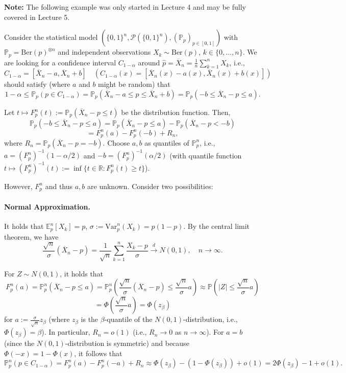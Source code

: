 \documentclass[open=any, 11pt,paper=A4]{scrreprt}
\begin{document}
\textbf{Note:} The following example was only started in Lecture 4 and may be fully covered in Lecture 5.

\begin{example}
Consider the statistical model \((\{0,1\}^n, \mathcal{P}(\{0,1\}^n), (\mathbb{P}_p)_{p \in [0,1]})\) with \(\mathbb{P}_p = \text{Ber}(p)^{\otimes n}\) and independent observations \(X_k \sim \text{Ber}(p)\), \( k \in \{0, \ldots, n\}\). We are looking for a confidence interval \( C_{1-\alpha} \) around \( \hat{p} = \overline{X}_n = \frac{1}{n} \sum_{k=1}^n X_k \), i.e.,
\[
C_{1-\alpha} = [\overline{X}_n - a, \overline{X}_n + b] \quad \left(C_{1-\alpha}(x) = [\overline{X}_n(x) - a(x), \overline{X}_n(x) + b(x)] \right)
\]
should satisfy (where \(a\) and \(b\) might be random) that
\[
1 - \alpha \leq \mathbb{P}_p \left( p \in C_{1-\alpha} \right) = \mathbb{P}_p \left( \overline{X}_n - a \leq p \leq \overline{X}_n + b \right) = \mathbb{P}_p \left(-b \leq \overline{X}_n - p \leq a \right).
\]

Let \(t \mapsto F_p^n(t) := \mathbb{P}_p \left( \overline{X}_n - p \leq t \right)\) be the distribution function. Then,
\[
\mathbb{P}_p \left(-b \leq \overline{X}_n - p \leq a \right) = \mathbb{P}_p \left( \overline{X}_n - p \leq a \right) - \mathbb{P}_p \left( \overline{X}_n - p < -b \right)
\]
\[
= F_p^n(a) - F_p^n(-b) + R_n,
\]
where \( R_n = \mathbb{P}_p \left( \overline{X}_n - p = -b \right) \). Choose \(a, b\) as quantiles of \(\mathbb{P}_p^n\), i.e., \(a = \left(F_p^n\right)^{-1}(1 - \alpha / 2)\) and \( -b = \left(F_p^n\right)^{-1}(\alpha / 2)\) (with quantile function \(t \mapsto \left(F_p^n\right)^{-1}(t) := \inf \{t \in \mathbb{R} : F_p^n(t) \geq t \}\)).

However, \(F_p^n\) and thus \(a, b\) are unknown. Consider two possibilities:

\paragraph{Normal Approximation.} It holds that \( \mathbb{E}_p^n[X_k] = p \), \( \sigma := \text{Var}_p^n(X_k) = p(1 - p) \). By the central limit theorem, we have
\[
\frac{\sqrt{n}}{\sigma} \left( \overline{X}_n - p \right) = \frac{1}{\sqrt{n}} \sum_{k=1}^n \frac{X_k - p}{\sigma} \xrightarrow{d} N(0,1), \quad n \to \infty.
\]

For \( Z \sim N(0,1) \), it holds that
\[
F_p^n(a) = \mathbb{P}_p^n \left( \overline{X}_n - p \leq a \right) = \mathbb{P}_p^n \left( \frac{\sqrt{n}}{\sigma} \left( \overline{X}_n - p \right) \leq \frac{\sqrt{n}}{\sigma} a \right) \approx \mathbb{P}(|Z| \leq \frac{\sqrt{n}}{\sigma} a)
\]
\[
= \Phi \left( \frac{\sqrt{n}}{\sigma} a \right) = \Phi(z_\beta)
\]
for \( a := \frac{\sigma}{\sqrt{n}} z_\beta \) (where \( z_\beta \) is the \( \beta \)-quantile of the \( N(0,1) \)-distribution, i.e., \( \Phi(z_\beta) = \beta \)). In particular, \( R_n = o(1) \) (i.e., \( R_n \to 0 \) as \( n \to \infty \)). For \( a = b \) (since the \( N(0,1) \)-distribution is symmetric) and because \( \Phi(-x) = 1 - \Phi(x) \), it follows that
\[
\mathbb{P}_p^n(p \in C_{1-\alpha}) = F_p^n(a) - F_p^n(-a) + R_n \approx \Phi(z_\beta) - (1 - \Phi(z_\beta)) + o(1) = 2 \Phi(z_\beta) - 1 + o(1).
\]


\end{example}
\end{document}
